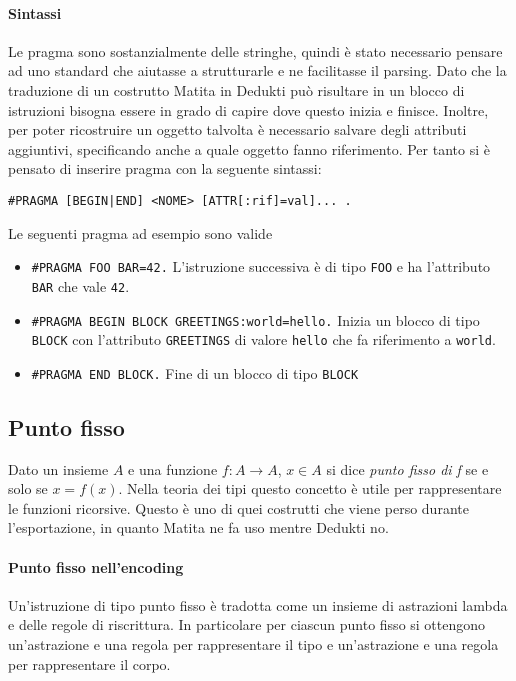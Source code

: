 \documentclass[12pt,a4paper]{report}
\begin{document}
\paragraph{Sintassi} Le pragma sono sostanzialmente delle stringhe, quindi
è stato necessario pensare ad uno standard che aiutasse a strutturarle e 
ne facilitasse il parsing. Dato che la traduzione di un costrutto Matita in 
Dedukti può risultare in un blocco di istruzioni bisogna essere in grado di
capire dove questo inizia e finisce. Inoltre, per poter ricostruire un oggetto
talvolta è necessario salvare degli attributi aggiuntivi, specificando anche
a quale oggetto fanno riferimento. Per tanto si è pensato di inserire pragma
con la seguente sintassi:

\begin{center}
  \texttt{\#PRAGMA [BEGIN|END] <NOME> [ATTR[:rif]=val]... .}
\end{center}
Le seguenti pragma ad esempio sono valide
\begin{itemize}
  \item  \texttt{\#PRAGMA FOO BAR=42.} L'istruzione successiva è di tipo
\texttt{FOO} e ha l'attributo \texttt{BAR} che vale \texttt{42}.
  \item  \texttt{\#PRAGMA BEGIN BLOCK GREETINGS:world=hello.} Inizia un blocco di
    tipo \texttt{BLOCK} con l'attributo \texttt{GREETINGS} di valore \texttt{hello}
    che fa riferimento a \texttt{world}.
  \item  \texttt{\#PRAGMA END BLOCK.} Fine di un blocco di tipo \texttt{BLOCK}
\end{itemize}

\subsection{Punto fisso}
Dato un insieme $A$ e una funzione $f: A \rightarrow A$, $x \in A$ si dice
\textit{punto fisso di f} se e solo se $x = f(x)$. Nella teoria dei tipi 
questo concetto è utile per rappresentare le funzioni ricorsive.
Questo è uno di quei costrutti che viene perso durante l'esportazione, in 
quanto Matita ne fa uso mentre Dedukti no.

\paragraph{Punto fisso nell'encoding} Un'istruzione di tipo punto fisso è tradotta
come un insieme di astrazioni lambda e delle regole di riscrittura. In particolare
per ciascun punto fisso si ottengono un'astrazione e una regola per rappresentare
il tipo e un'astrazione e una regola per rappresentare il corpo.
\end{document}
